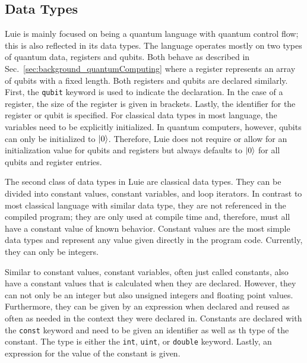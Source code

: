 \subsection{Data Types}
\label{sec:concept_dataTypes}
Luie is mainly focused on being a quantum language with quantum control flow; this is also reflected in its data types. The language operates mostly on two types of quantum data, registers and qubits. Both behave as described in Sec.~\ref{sec:background_quantumComputing} where a register represents an array of qubits with a fixed length.
Both registers and qubits are declared similarly. First, the \texttt{qubit} keyword is used to indicate the declaration. In the case of a register, the size of the register is given in brackets. Lastly, the identifier for the register or qubit is specified. For classical data types in most language, the variables need to be explicitly initialized. In quantum computers, however, qubits can only be initialized to $\ket{0}$. Therefore, Luie does not require or allow for an initialization value for qubits and registers but always defaults to $\ket{0}$ for all qubits and register entries.

The second class of data types in Luie are classical data types. They can be divided into constant values, constant variables, and loop iterators. In contrast to most classical language with similar data type, they are not referenced in the compiled program; they are only used at compile time and, therefore, must all have a constant value of known behavior. 
Constant values are the most simple data types and represent any value given directly in the program code. Currently, they can only be integers. 

Similar to constant values, constant variables, often just called constants, also have a constant values that is calculated when they are declared. However, they can not only be an integer but also unsigned integers and floating point values. Furthermore, they can be given by an expression when declared and reused as often as needed in the context they were declared in. Constants are declared with the \texttt{const} keyword and need to be given an identifier as well as th type of the constant. The type is either the \texttt{int}, \texttt{uint}, or \texttt{double} keyword. Lastly, an expression for the value of the constant is given.  

